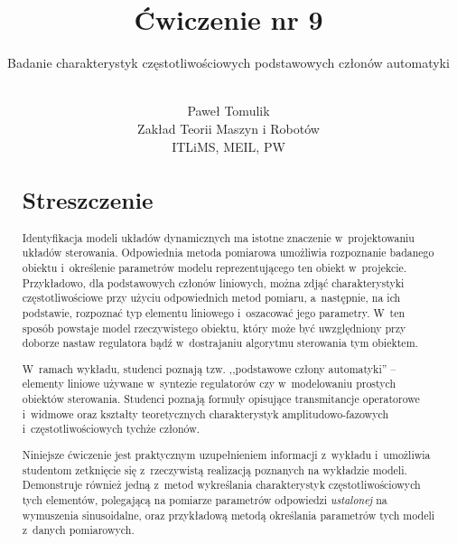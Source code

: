 \documentclass[paper=a4,DIV=12]{lpas}
\begin{document}

\title{\Large{Ćwiczenie nr 9}}

\subtitle{\huge{Badanie charakterystyk częstotliwościowych podstawowych członów automatyki}}

\author{\\Paweł Tomulik\\ Zakład Teorii Maszyn i Robotów\\ ITLiMS, MEIL, PW}
\date{}
\maketitle
\thispagestyle{empty}

\pagebreak
\tableofcontents
\pagebreak

\begin{abstract}
\section{Streszczenie}
\noindent Identyfikacja modeli układów dynamicznych ma istotne znaczenie
  w~projektowaniu układów sterowania. Odpowiednia metoda pomiarowa umożliwia
  rozpoznanie badanego obiektu i~określenie parametrów modelu reprezentującego
  ten obiekt w~projekcie. Przykładowo, dla podstawowych członów liniowych,
  można zdjąć charakterystyki częstotliwościowe przy użyciu odpowiednich metod
  pomiaru, a~następnie, na ich podstawie, rozpoznać typ elementu liniowego
  i~oszacować jego parametry. W~ten sposób powstaje model rzeczywistego
  obiektu, który może być uwzględniony przy doborze nastaw regulatora bądź
  w~dostrajaniu algorytmu sterowania tym obiektem.

  W~ramach wykładu, studenci poznają tzw. ,,podstawowe człony automatyki'' --
  elementy liniowe używane w~syntezie regulatorów czy w~modelowaniu prostych
  obiektów sterowania. Studenci poznają formuły opisujące transmitancje
  operatorowe i~widmowe oraz kształty teoretycznych charakterystyk
  amplitudowo-fazowych i~częstotliwościowych tychże członów.

  Niniejsze ćwiczenie jest praktycznym uzupełnieniem informacji z~wykładu
  i~umożliwia studentom zetknięcie się z~rzeczywistą realizacją poznanych na
  wykładzie modeli. Demonstruje również jedną z~metod wykreślania
  charakterystyk częstotliwościowych tych elementów, polegającą na pomiarze
  parametrów odpowiedzi {\em ustalonej} na wymuszenia sinusoidalne, oraz
  przykładową metodą określania parametrów tych modeli z~danych pomiarowych.
\end{abstract}
\end{document}
